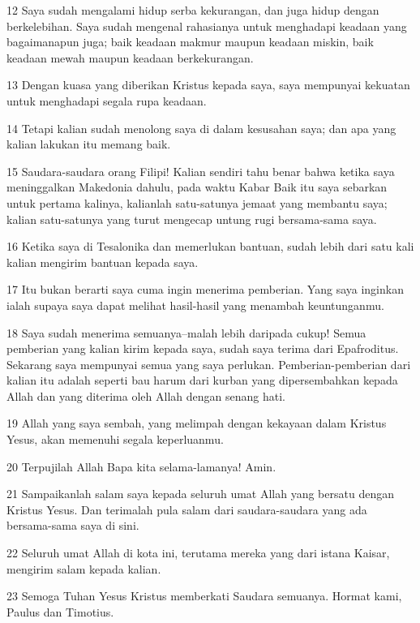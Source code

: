 \par 12 Saya sudah mengalami hidup serba kekurangan, dan juga hidup dengan berkelebihan. Saya sudah mengenal rahasianya untuk menghadapi keadaan yang bagaimanapun juga; baik keadaan makmur maupun keadaan miskin, baik keadaan mewah maupun keadaan berkekurangan.
\par 13 Dengan kuasa yang diberikan Kristus kepada saya, saya mempunyai kekuatan untuk menghadapi segala rupa keadaan.
\par 14 Tetapi kalian sudah menolong saya di dalam kesusahan saya; dan apa yang kalian lakukan itu memang baik.
\par 15 Saudara-saudara orang Filipi! Kalian sendiri tahu benar bahwa ketika saya meninggalkan Makedonia dahulu, pada waktu Kabar Baik itu saya sebarkan untuk pertama kalinya, kalianlah satu-satunya jemaat yang membantu saya; kalian satu-satunya yang turut mengecap untung rugi bersama-sama saya.
\par 16 Ketika saya di Tesalonika dan memerlukan bantuan, sudah lebih dari satu kali kalian mengirim bantuan kepada saya.
\par 17 Itu bukan berarti saya cuma ingin menerima pemberian. Yang saya inginkan ialah supaya saya dapat melihat hasil-hasil yang menambah keuntunganmu.
\par 18 Saya sudah menerima semuanya--malah lebih daripada cukup! Semua pemberian yang kalian kirim kepada saya, sudah saya terima dari Epafroditus. Sekarang saya mempunyai semua yang saya perlukan. Pemberian-pemberian dari kalian itu adalah seperti bau harum dari kurban yang dipersembahkan kepada Allah dan yang diterima oleh Allah dengan senang hati.
\par 19 Allah yang saya sembah, yang melimpah dengan kekayaan dalam Kristus Yesus, akan memenuhi segala keperluanmu.
\par 20 Terpujilah Allah Bapa kita selama-lamanya! Amin.
\par 21 Sampaikanlah salam saya kepada seluruh umat Allah yang bersatu dengan Kristus Yesus. Dan terimalah pula salam dari saudara-saudara yang ada bersama-sama saya di sini.
\par 22 Seluruh umat Allah di kota ini, terutama mereka yang dari istana Kaisar, mengirim salam kepada kalian.
\par 23 Semoga Tuhan Yesus Kristus memberkati Saudara semuanya. Hormat kami, Paulus dan Timotius.


